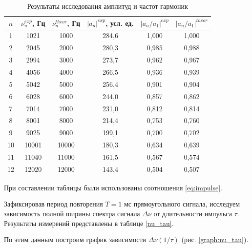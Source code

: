 \documentclass[a4paper, 12pt]{article}
\begin{document}
    \begin{table}[H]
        \centering
        \begin{tabular}{|c|c|c|c|c|c|}
        \hline
        $n$ & $\nu_{n}^{exp}$, Гц & $\nu_{n}^{theor}$, Гц & $\lvert a_n\rvert^{exp}$, усл. ед. & $\lvert a_n/a_1\rvert^{exp}$ & $\lvert a_n/a_1\rvert^{theor}$ \\ \hline
        1 & 1021 & 1000 & 284,6 & 1,000 & 1,000 \\ \hline
        2 & 2045 & 2000 & 280,3 & 0,985 & 0,988 \\ \hline
        3 & 2994 & 3000 & 273,7 & 0,962 & 0,967 \\ \hline
        4 & 4056 & 4000 & 266,5 & 0,936 & 0,939 \\ \hline
        5 & 5042 & 5000 & 256,4 & 0,901 & 0,904 \\ \hline
        6 & 6028 & 6000 & 244,0 & 0,857 & 0,862 \\ \hline
        7 & 7014 & 7000 & 231,0 & 0,812 & 0,814 \\ \hline
        8 & 8001 & 8000 & 214,4 & 0,753 & 0,760 \\ \hline
        9 & 9025 & 9000 & 199,1 & 0,700 & 0,702 \\ \hline
        10 & 10001 & 10000 & 180,3 & 0,634 & 0,639 \\ \hline
        11 & 11040 & 11000 & 161,5 & 0,567 & 0,574 \\ \hline
        12 & 12020 & 12000 & 143,4 & 0,504 & 0,507 \\ \hline
        \end{tabular}
        \caption{Результаты исследования амплитуд и частот гармоник}
        \label{harmonic_relations}
    \end{table}

    При составлении таблицы были использованы соотношения \ref{eq:impulse}.

    Зафиксировав период повторения $T = 1$ мс прямоугольного сигнала, исследуем зависимость полной ширины спектра сигнала $\Delta \nu$ от длительности импульса $\tau$. Результаты измерений представлены в таблице \ref{nu_tau}.

    По этим данным построим график зависимости $\Delta \nu \left( 1/\tau \right)$ (рис. \ref{graph:nu_tau}).
\end{document}
